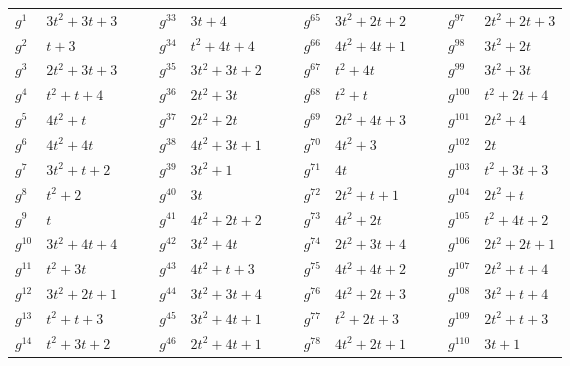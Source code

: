 \documentclass[12pt,a4paper,titlepage]{article}
\begin{document}
\begin{table}[h!]
\begin{center}
\begin{tabular}{llllllllllllll}
$g^{1}$  & $3t^2 + 3t + 3$ &  &  & $g^{33}$ & $3t + 4$        &  &  & $g^{65}$ & $3t^2 + 2t + 2$ &  &  & $g^{97}$  & $2t^2 + 2t + 3$ \\
$g^{2}$  & $t + 3$         &  &  & $g^{34}$ & $t^2 + 4t + 4$  &  &  & $g^{66}$ & $4t^2 + 4t + 1$ &  &  & $g^{98}$  & $3t^2 + 2t$     \\
$g^{3}$  & $2t^2 + 3t + 3$ &  &  & $g^{35}$ & $3t^2 + 3t + 2$ &  &  & $g^{67}$ & $t^2 + 4t$      &  &  & $g^{99}$  & $3t^2 + 3t$     \\
$g^{4}$  & $t^2 + t + 4$   &  &  & $g^{36}$ & $2t^2 + 3t$     &  &  & $g^{68}$ & $t^2 + t$       &  &  & $g^{100}$ & $t^2 + 2t + 4$  \\
$g^{5}$  & $4t^2 + t$      &  &  & $g^{37}$ & $2t^2 + 2t$     &  &  & $g^{69}$ & $2t^2 + 4t + 3$ &  &  & $g^{101}$ & $2t^2 + 4$      \\
$g^{6}$  & $4t^2 + 4t$     &  &  & $g^{38}$ & $4t^2 + 3t + 1$ &  &  & $g^{70}$ & $4t^2 + 3$      &  &  & $g^{102}$ & $2t$            \\
$g^{7}$  & $3t^2 + t + 2$  &  &  & $g^{39}$ & $3t^2 + 1$      &  &  & $g^{71}$ & $4t$            &  &  & $g^{103}$ & $t^2 + 3t + 3$  \\
$g^{8}$  & $t^2 + 2$       &  &  & $g^{40}$ & $3t$            &  &  & $g^{72}$ & $2t^2 + t + 1$  &  &  & $g^{104}$ & $2t^2 + t$      \\
$g^{9}$  & $t$             &  &  & $g^{41}$ & $4t^2 + 2t + 2$ &  &  & $g^{73}$ & $4t^2 + 2t$     &  &  & $g^{105}$ & $t^2 + 4t + 2$  \\
$g^{10}$ & $3t^2 + 4t + 4$ &  &  & $g^{42}$ & $3t^2 + 4t$     &  &  & $g^{74}$ & $2t^2 + 3t + 4$ &  &  & $g^{106}$ & $2t^2 + 2t + 1$ \\
$g^{11}$ & $t^2 + 3t$      &  &  & $g^{43}$ & $4t^2 + t + 3$  &  &  & $g^{75}$ & $4t^2 + 4t + 2$ &  &  & $g^{107}$ & $2t^2 + t + 4$  \\
$g^{12}$ & $3t^2 + 2t + 1$ &  &  & $g^{44}$ & $3t^2 + 3t + 4$ &  &  & $g^{76}$ & $4t^2 + 2t + 3$ &  &  & $g^{108}$ & $3t^2 + t + 4$  \\
$g^{13}$ & $t^2 + t + 3$   &  &  & $g^{45}$ & $3t^2 + 4t + 1$ &  &  & $g^{77}$ & $t^2 + 2t + 3$  &  &  & $g^{109}$ & $2t^2 + t + 3$  \\
$g^{14}$ & $t^2 + 3t + 2$  &  &  & $g^{46}$ & $2t^2 + 4t + 1$ &  &  & $g^{78}$ & $4t^2 + 2t + 1$ &  &  & $g^{110}$ & $3t + 1$        \\

\end{tabular}
\end{center}
\end{table}
\end{document}
